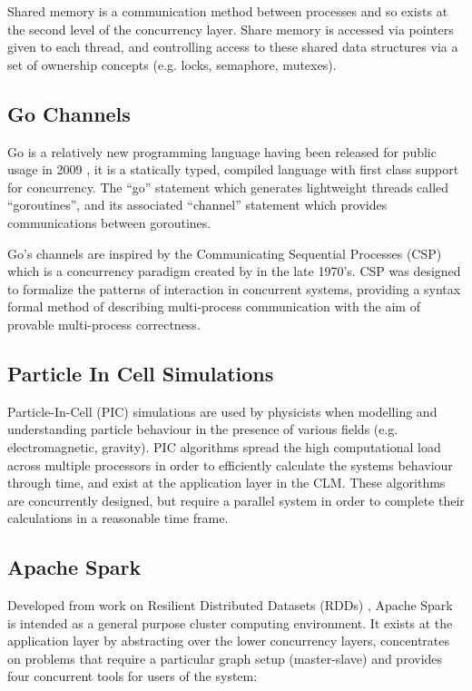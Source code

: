 \documentclass{sig-alternate}
\begin{document}
Shared memory is a communication method between processes and so exists at the second level of the concurrency layer. Share memory is accessed via pointers given to each thread, and controlling access to these shared data structures via a set of ownership concepts (e.g. locks, semaphore, mutexes).

\subsection{Go Channels}
Go is a relatively new programming language having been released for public usage in 2009 \cite{go:_frequen_asked_quest}, it is a statically typed, compiled language with first class support for concurrency. The ``go'' statement which generates lightweight threads called ``goroutines'', and its associated ``channel'' statement which provides communications between goroutines.

Go's channels are inspired by the Communicating Sequential Processes (CSP) which is a concurrency paradigm created by \cite{Hoare:1978:CSP:359576.359585} in the late 1970's. CSP was designed to formalize the patterns of interaction in concurrent systems, providing a syntax formal method of describing multi-process communication with the aim of provable multi-process correctness.

\subsection{Particle In Cell Simulations}
Particle-In-Cell (PIC) simulations are used by physicists when modelling and understanding particle behaviour in the presence of various fields (e.g. electromagnetic, gravity). PIC algorithms spread the high computational load across multiple processors in order to efficiently calculate the systems behaviour through time, and exist at the application layer in the CLM. These algorithms are concurrently designed, but require a parallel system in order to complete their calculations in a reasonable time frame. 

\subsection{Apache Spark}
Developed from work on Resilient Distributed Datasets (RDDs)  \cite{zaharia14:_archit_fast_gener_data_proces_large_clust},  Apache Spark is intended as a general purpose cluster computing environment. It exists at the application layer by abstracting over the lower concurrency layers, concentrates on problems that require a particular graph setup (master-slave) and provides four concurrent tools for users of the system:
\end{document}
